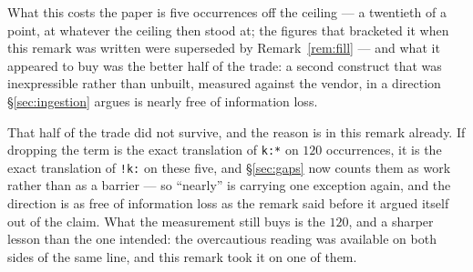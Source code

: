 \begin{remark}
What this costs the paper is five occurrences off the ceiling --- a twentieth of a
point, at whatever the ceiling then stood at; the figures that bracketed it when this
remark was written were superseded by Remark~\ref{rem:fill} --- and what it appeared to
buy was the better half of the trade: a second construct that was inexpressible rather
than unbuilt, measured against the vendor, in a direction \S\ref{sec:ingestion} argues is
nearly free of information loss.

That half of the trade did not survive, and the reason is in this remark already. If
dropping the term is the exact translation of \texttt{k:*} on $120$ occurrences, it is
the exact translation of \texttt{!k:} on these five, and \S\ref{sec:gaps} now counts
them as work rather than as a barrier --- so ``nearly'' is carrying one exception again,
and the direction is as free of information loss as the remark said before it argued
itself out of the claim. What the measurement still buys is the $120$, and a sharper
lesson than the one intended: the overcautious reading was available on both sides of
the same line, and this remark took it on one of them.
\end{remark}
